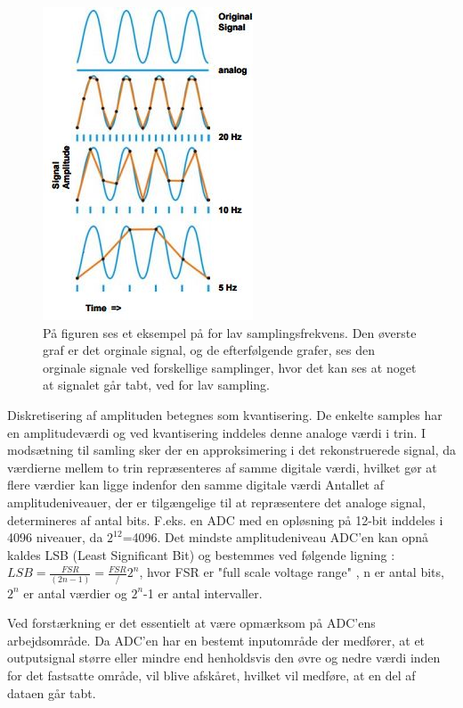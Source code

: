 \begin{figure}[H]
	\centering
	\includegraphics[scale=1.0]{figures/bProblemanalyse/samplingsfrekvens.JPG}
	\caption{På figuren ses et eksempel på for lav samplingsfrekvens. Den øverste graf er det orginale signal, og de efterfølgende grafer, ses den orginale signale ved forskellige samplinger, hvor det kan ses at noget at signalet går tabt, ved for lav sampling. \cite{konrad2006}}
	\label{samplingsfrekvens}
\end{figure}
 
Diskretisering af amplituden betegnes som kvantisering. De enkelte samples har en amplitudeværdi og ved kvantisering inddeles denne analoge værdi i trin. I modsætning til samling sker der en approksimering i det rekonstruerede signal, da værdierne mellem to trin repræsenteres af samme digitale værdi, hvilket gør at flere værdier kan ligge indenfor den samme digitale værdi \cite{Zouridakis2003} Antallet af amplitudeniveauer, der er tilgængelige til at repræsentere det analoge signal, determineres af antal bits. F.eks. en ADC med en opløsning på 12-bit inddeles i 4096 niveauer, da $2^12$=4096. \cite{Konrad2006} Det mindste amplitudeniveau ADC'en kan opnå kaldes LSB (Least Significant Bit) og bestemmes ved følgende ligning : 
$LSB = \frac{FSR}{(2n-1)} = \frac{FSR}/{2^n}$, hvor FSR er "full scale voltage range" , n er antal bits, $2^n$ er antal værdier og $2^n$-1 er antal intervaller. 

Ved forstærkning er det essentielt at være opmærksom på ADC'ens  arbejdsområde. 
Da ADC'en har en bestemt inputområde der medfører, at et outputsignal større eller mindre end
henholdsvis den øvre og nedre værdi inden for det fastsatte område, vil blive afskåret, hvilket
vil medføre, at en del af dataen går tabt.
 




 